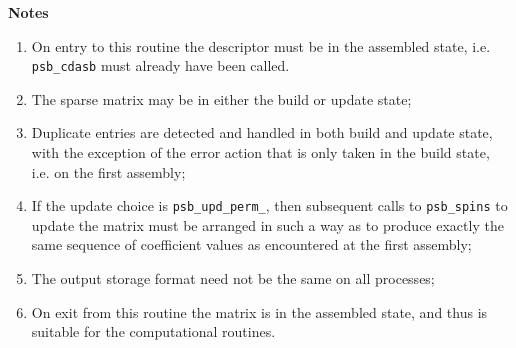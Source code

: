 {\par\noindent\large\bfseries Notes}
\begin{enumerate}
\item On entry to this routine the descriptor must  be in  the
  assembled state, i.e. \verb|psb_cdasb| must already have been called.
\item The sparse matrix may be in either the build or update state;
\item Duplicate entries are detected and handled in both build and
  update state, with the exception of the error action that is only
  taken in the build state, i.e. on the first assembly; 
\item If the update choice is \verb|psb_upd_perm_|, then subsequent
  calls to \verb|psb_spins| to update the matrix must be arranged in
  such a way as to produce exactly the same sequence of coefficient
  values as encountered at the first assembly; 
\item The output storage format need not be the same on all
  processes; 
\item On exit from this routine the matrix is in the assembled state,
  and thus is suitable for the computational routines. 
\end{enumerate}






